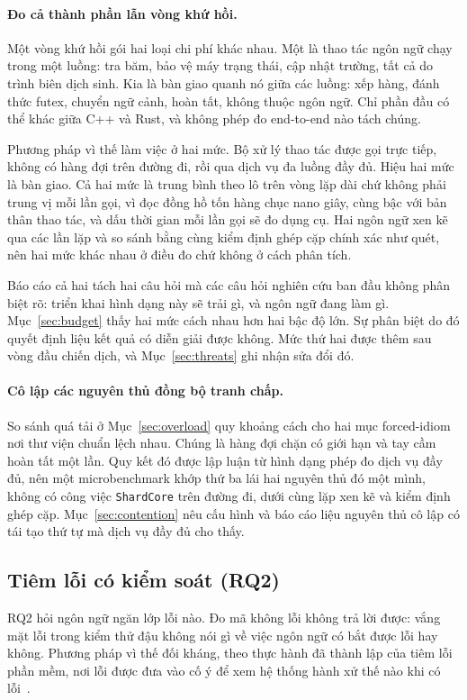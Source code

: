 \paragraph{Đo cả thành phần lẫn vòng khứ hồi.}
Một vòng khứ hồi gói hai loại chi phí khác nhau. Một là thao tác ngôn ngữ chạy trong một luồng:
tra băm, bảo vệ máy trạng thái, cập nhật trường, tất cả do trình biên dịch sinh. Kia là bàn
giao quanh nó giữa các luồng: xếp hàng, đánh thức futex, chuyển ngữ cảnh, hoàn tất, không thuộc
ngôn ngữ. Chỉ phần đầu có thể khác giữa C++ và Rust, và không phép đo end-to-end nào tách chúng.

Phương pháp vì thế làm việc ở hai mức. Bộ xử lý thao tác được gọi trực tiếp, không có hàng đợi
trên đường đi, rồi qua dịch vụ đa luồng đầy đủ. Hiệu hai mức là bàn giao. Cả hai mức là trung
bình theo lô trên vòng lặp dài chứ không phải trung vị mỗi lần gọi, vì đọc đồng hồ tốn hàng chục
nano giây, cùng bậc với bản thân thao tác, và dấu thời gian mỗi lần gọi sẽ đo dụng cụ. Hai ngôn
ngữ xen kẽ qua các lần lặp và so sánh bằng cùng kiểm định ghép cặp chính xác như quét, nên hai
mức khác nhau ở điều đo chứ không ở cách phân tích.

Báo cáo cả hai tách hai câu hỏi mà các câu hỏi nghiên cứu ban đầu không phân biệt rõ: triển khai
hình dạng này sẽ trải gì, và ngôn ngữ đang làm gì. Mục~\ref{sec:budget} thấy hai mức cách nhau
hơn hai bậc độ lớn. Sự phân biệt do đó quyết định liệu kết quả có diễn giải được không. Mức thứ
hai được thêm sau vòng đầu chiến dịch, và Mục~\ref{sec:threats} ghi nhận sửa đổi đó.

\paragraph{Cô lập các nguyên thủ đồng bộ tranh chấp.}
So sánh quá tải ở Mục~\ref{sec:overload} quy khoảng cách cho hai mục forced-idiom nơi thư viện
chuẩn lệch nhau. Chúng là hàng đợi chặn có giới hạn và tay cầm hoàn tất một lần. Quy kết đó được
lập luận từ hình dạng phép đo dịch vụ đầy đủ, nên một microbenchmark khớp thứ ba lái hai nguyên
thủ đó một mình, không có công việc \texttt{ShardCore} trên đường đi, dưới cùng lặp xen kẽ và
kiểm định ghép cặp. Mục~\ref{sec:contention} nêu cấu hình và báo cáo liệu nguyên thủ cô lập có
tái tạo thứ tự mà dịch vụ đầy đủ cho thấy.

\subsection{Tiêm lỗi có kiểm soát (RQ2)}\label{sec:methodfaults}
RQ2 hỏi ngôn ngữ ngăn lớp lỗi nào. Đo mã không lỗi không trả lời được: vắng mặt lỗi trong kiểm
thử đậu không nói gì về việc ngôn ngữ có bắt được lỗi hay không. Phương pháp vì thế đối kháng,
theo thực hành đã thành lập của tiêm lỗi phần mềm, nơi lỗi được đưa vào cố ý để xem hệ thống
hành xử thế nào khi có lỗi~\cite{natella2016fault}.

